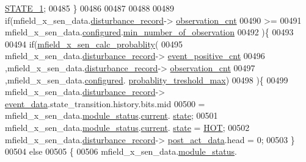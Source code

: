 \begin{DoxyCode}
      \hyperlink{a00021_a727351838367f27ac0adb9a13422c342}{STATE\_1};
00485             \}
00486 
00487 
00488 
00489                \textcolor{keywordflow}{if}(mfield\_x\_sen\_data.\hyperlink{a00025_ac9b38e2c1d3f1013a88d33506c754152}{disturbance\_record}->
      \hyperlink{a00028_ad5b0bac02ce266b91b2b52a1c3ea1d78}{observation\_cnt}
00490                 >=
00491                 mfield\_x\_sen\_data.\hyperlink{a00025_a94b2d1f6ea4ab334c74d24984dd27843}{configured}.\hyperlink{a00021_ae8665e8bf422c1482442d6949ba28408}{min\_number\_of\_observation}
00492                )\{
00493 
00494                    \textcolor{keywordflow}{if}(\hyperlink{a00052_aeb1e6622fe9af5c31bd0d17ab01dd23a}{mfield\_x\_sen\_calc\_probablity}(
00495                              mfield\_x\_sen\_data.\hyperlink{a00025_ac9b38e2c1d3f1013a88d33506c754152}{disturbance\_record}->
      \hyperlink{a00028_a7397b9d76d4b57500f27bb23d258a18a}{event\_positive\_cnt}
00496                             ,mfield\_x\_sen\_data.\hyperlink{a00025_ac9b38e2c1d3f1013a88d33506c754152}{disturbance\_record}->
      \hyperlink{a00028_ad5b0bac02ce266b91b2b52a1c3ea1d78}{observation\_cnt}
00497                             ,mfield\_x\_sen\_data.\hyperlink{a00025_a94b2d1f6ea4ab334c74d24984dd27843}{configured}.
      \hyperlink{a00021_a7e2d217b9c9051d361319180a426851c}{probablity\_treshold\_max})
00498                      )\{
00499                         mfield\_x\_sen\_data.\hyperlink{a00025_ac9b38e2c1d3f1013a88d33506c754152}{disturbance\_record}->
      \hyperlink{a00028_a8c0bda69e71ef674e60da47ad0be9ab0}{event\_data}.state\_transition.history.bits.mid
00500                          = mfield\_x\_sen\_data.\hyperlink{a00025_adfab5a5d8b45a93dfb13edb24e2b80e3}{module\_status}.\hyperlink{a00019_acf41ffc11da291c2f9f0fcb02ee72b98}{current}.
      \hyperlink{a00019_a6b8d8e916bc56265a3fd279bd26b6d1b}{state};
00501                          mfield\_x\_sen\_data.\hyperlink{a00025_adfab5a5d8b45a93dfb13edb24e2b80e3}{module\_status}.\hyperlink{a00019_acf41ffc11da291c2f9f0fcb02ee72b98}{current}.
      \hyperlink{a00019_a6b8d8e916bc56265a3fd279bd26b6d1b}{state} = \hyperlink{a00021_a1eb14cc432874ddacd1934791dbe12a3}{HOT};
00502                          mfield\_x\_sen\_data.\hyperlink{a00025_ac9b38e2c1d3f1013a88d33506c754152}{disturbance\_record}->
      \hyperlink{a00028_a9c699c0cc82d0baa6e49195f185ab34f}{post\_act\_data}.head = 0;
00503                        \}
00504                        \textcolor{keywordflow}{else}
00505                        \{
00506                              mfield\_x\_sen\_data.\hyperlink{a00025_adfab5a5d8b45a93dfb13edb24e2b80e3}{module\_status}.

\end{DoxyCode}
